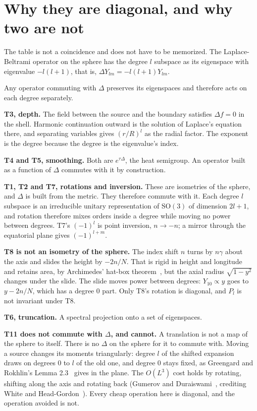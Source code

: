 \section{Why they are diagonal, and why two are not}

The table is not a coincidence and does not have to be memorized. The Laplace-Beltrami operator on the sphere has the degree \(l\) subspace as its eigenspace with eigenvalue \(-l(l+1)\), that is, \(\Delta Y_{lm} = -l(l+1) Y_{lm}\).

Any operator commuting with \(\Delta\) preserves its eigenspaces and therefore acts on each degree separately.

\textbf{T3, depth.} The field between the source and the boundary satisfies \(\Delta f = 0\) in the shell. Harmonic continuation outward is the solution of Laplace's equation there, and separating variables gives \((r/R)^l\) as the radial factor. The exponent is the degree because the degree is the eigenvalue's index.

\textbf{T4 and T5, smoothing.} Both are \(e^{\tau\Delta}\), the heat semigroup. An operator built as a function of \(\Delta\) commutes with it by construction.

\textbf{T1, T2 and T7, rotations and inversion.} These are isometries of the sphere, and \(\Delta\) is built from the metric. They therefore commute with it. Each degree \(l\) subspace is an irreducible unitary representation of \(\mathrm{SO}(3)\) of dimension \(2l+1\), and rotation therefore mixes orders inside a degree while moving no power between degrees. T7's \((-1)^l\) is point inversion, \(n \to -n\); a mirror through the equatorial plane gives \((-1)^{l+m}\).

\textbf{T8 is not an isometry of the sphere.} The index shift \(n\) turns by \(n\gamma\) about the axis and slides the height by \(-2n/N\). That is rigid in height and longitude and retains area, by Archimedes' hat-box theorem~\cite[\emph{On the Sphere and Cylinder} I, Propositions 33, 42 and 43]{src:Heath-1897}, but the axial radius \(\sqrt{1 - y^2}\) changes under the slide. The slide moves power between degrees: \(Y_{10} \propto y\) goes to \(y - 2n/N\), which has a degree \(0\) part. Only T8's rotation is diagonal, and \(P_l\) is not invariant under T8.

\textbf{T6, truncation.} A spectral projection onto a set of eigenspaces.

\textbf{T11 does not commute with \(\Delta\), and cannot.} A translation is not a map of the sphere to itself. There is no \(\Delta\) on the sphere for it to commute with. Moving a source changes its moments triangularly: degree \(l\) of the shifted expansion draws on degrees \(0\) to \(l\) of the old one, and degree \(0\) stays fixed, as Greengard and Rokhlin's Lemma 2.3~\cite[Section~2]{src:Greengard-and-Rokhlin-1987} gives in the plane. The \(O(L^3)\) cost holds by rotating, shifting along the axis and rotating back (Gumerov and Duraiswami~\cite[Section~1]{src:Gumerov-and-Duraiswami-2014}, crediting White and Head-Gordon~\cite{src:White-and-Head-Gordon-1996}). Every cheap operation here is diagonal, and the operation avoided is not.

